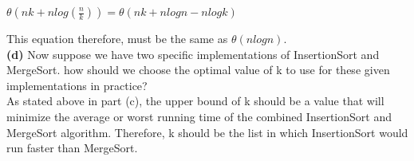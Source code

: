 \documentclass[12pt]{article}
\begin{document}
\begin{center}
$\theta(nk + nlog(\frac{n}{k})) = \theta(nk + nlogn - nlogk)$
\end{center}
This equation therefore, must be the same as $\theta(nlogn)$. \\
\linebreak
\textbf{(d)} Now suppose we have two specific implementations of InsertionSort and MergeSort. how should we choose the optimal value of k to use for these given implementations in practice? \\
\linebreak
As stated above in part (c), the upper bound of k should be a value that will minimize the average or worst running time of the combined InsertionSort and MergeSort algorithm.  Therefore,  k should be the list in which InsertionSort would run faster than MergeSort. 
\end{document}
